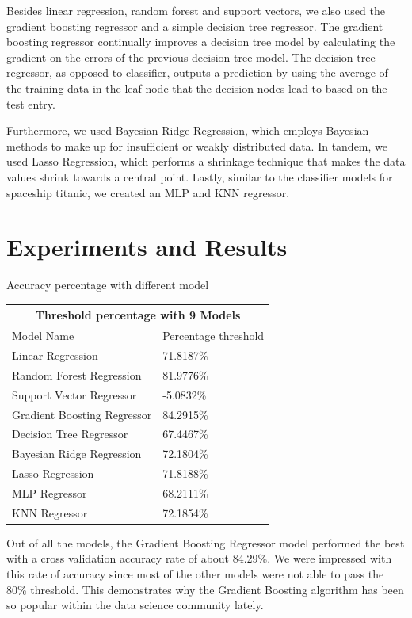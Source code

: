 \documentclass[fleqn,10pt]{SelfArx} %
\begin{document}
Besides linear regression, random forest and support vectors, we also used the gradient boosting regressor and a simple decision tree regressor. The gradient boosting regressor continually improves a decision tree model by calculating the gradient on the errors of the previous decision tree model. The decision tree regressor, as opposed to classifier, outputs a prediction by using the average of the training data in the leaf node that the decision nodes lead to based on the test entry. 

Furthermore, we used Bayesian Ridge Regression, which employs Bayesian methods to make up for insufficient or weakly distributed data. In tandem, we used Lasso Regression, which performs a shrinkage technique that makes the data values shrink towards a central point. Lastly, similar to the classifier models for spaceship titanic, we created an MLP and KNN regressor. 

\bigskip
\bigskip
\section{Experiments and Results}

Accuracy percentage with different model 
\bigskip

\begin{tabular}{ |p{4.5cm}|p{3cm}|}
\hline
\multicolumn{2}{|c|}{Threshold percentage with 9 Models} \\
\hline
Model Name& Percentage threshold \\
\hline
Linear Regression & 71.8187\% \\
Random Forest Regression	 & 81.9776\%\\
Support Vector Regressor & -5.0832\% \\
Gradient Boosting Regressor    & 84.2915\% \\
Decision Tree Regressor	 & 67.4467\%\\
Bayesian Ridge Regression & 72.1804\% \\
Lasso Regression& 71.8188\%  \\
MLP Regressor & 68.2111\% \\
KNN Regressor	 & 72.1854\%  \\
\hline
\end{tabular}
\bigskip

Out of all the models, the Gradient Boosting Regressor model performed the best with a cross validation accuracy rate of about 84.29\%. We were impressed with this rate of accuracy since most of the other models were not able to pass the 80\% threshold. This demonstrates why the Gradient Boosting algorithm has been so popular within the data science community lately. 
\end{document}

